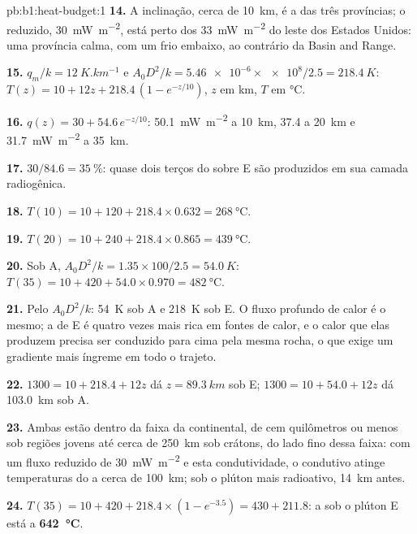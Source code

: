 \begin{solution}{pb:b1:heat-budget:1}
\textbf{14.} A inclinação, cerca de \qty{10}{km}, é a das três províncias; o  reduzido, \qty{30}{mW.m^{-2}}, está perto dos \qty{33}{mW.m^{-2}} do leste dos
Estados Unidos: uma província calma, com um  frio embaixo, ao contrário da
Basin and Range.

\textbf{15.} $q_m/k = \qty{12}{K.km^{-1}}$ e $A_0D^2/k = \num{5.46e-6}\times\num{e8}/2.5
= \qty{218.4}{K}$: $T(z) = 10 + 12z + 218.4\,(1 - e^{-z/10})$, $z$ em km, $T$ em
\unit{\degreeCelsius}.

\textbf{16.} $q(z) = 30 + 54.6\,e^{-z/10}$: \qty{50.1}{mW.m^{-2}} a \qty{10}{km},
\num{37.4} a \qty{20}{km} e \qty{31.7}{mW.m^{-2}} a \qty{35}{km}.

\textbf{17.} $30/84.6 = \qty{35}{\percent}$: quase dois terços do 
sobre E são produzidos em sua camada radiogênica.

\textbf{18.} $T(10) = 10 + 120 + 218.4\times0.632 = \qty{268}{\degreeCelsius}$.

\textbf{19.} $T(20) = 10 + 240 + 218.4\times0.865 = \qty{439}{\degreeCelsius}$.

\textbf{20.} Sob A, $A_0D^2/k = 1.35\times100/2.5 = \qty{54.0}{K}$:
$T(35) = 10 + 420 + 54.0\times0.970 = \qty{482}{\degreeCelsius}$.

\textbf{21.} Pelo $A_0D^2/k$: \qty{54}{K} sob A e \qty{218}{K} sob E. O fluxo profundo
de calor é o mesmo; a  de E é quatro vezes mais rica em fontes de calor, e o calor
que elas produzem precisa ser conduzido para cima pela mesma rocha, o que exige um
gradiente mais íngreme em todo o trajeto.

\textbf{22.} $1300 = 10 + 218.4 + 12z$ dá $z = \qty{89.3}{km}$ sob E;
$1300 = 10 + 54.0 + 12z$ dá \qty{103.0}{km} sob A.

\textbf{23.} Ambas estão dentro da faixa da  continental, de cem quilômetros ou menos sob regiões jovens até cerca de \qty{250}{km} sob
crátons, do lado fino dessa faixa: com um fluxo reduzido de \qty{30}{mW.m^{-2}} e esta
condutividade, o  condutivo atinge temperaturas do  a cerca de
\qty{100}{km}; sob o plúton mais radioativo, \qty{14}{km} antes.

\textbf{24.} $T(35) = 10 + 420 + 218.4\times(1 - e^{-3.5}) = 430 + 211.8$: a
 sob o plúton E está a
\textbf{\qty[text-series-to-math=true]{642}{\degreeCelsius}}.
\end{solution}
